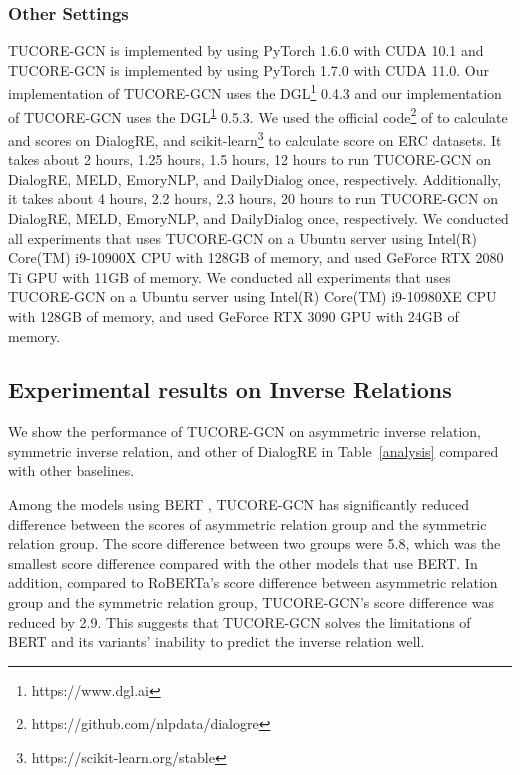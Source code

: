 \documentclass[11pt]{article}
\begin{document}
\subsubsection{Other Settings}
TUCORE-GCN is implemented by using PyTorch 1.6.0 with CUDA 10.1 and TUCORE-GCN is implemented by using PyTorch 1.7.0 with CUDA 11.0. Our implementation of TUCORE-GCN uses the DGL\footnote{\label{note}https://www.dgl.ai} 0.4.3 and our implementation of TUCORE-GCN uses the DGL\textsuperscript{\ref{note}} 0.5.3. We used the official code\footnote{https://github.com/nlpdata/dialogre} of \citep{yu-etal-2020-dialogue} to calculate  and  scores on DialogRE, and scikit-learn\footnote{https://scikit-learn.org/stable} to calculate  score on ERC datasets. It takes about 2 hours, 1.25 hours, 1.5 hours, 12 hours to run TUCORE-GCN on DialogRE, MELD, EmoryNLP, and DailyDialog once, respectively. Additionally, it takes about 4 hours, 2.2 hours, 2.3 hours, 20 hours to run TUCORE-GCN on DialogRE, MELD, EmoryNLP, and DailyDialog once, respectively. We conducted all experiments that uses TUCORE-GCN on a Ubuntu server using Intel(R) Core(TM) i9-10900X CPU with 128GB of memory, and used GeForce RTX 2080 Ti GPU with 11GB of memory. We conducted all experiments that uses TUCORE-GCN on a Ubuntu server using Intel(R) Core(TM) i9-10980XE CPU with 128GB of memory, and used GeForce RTX 3090 GPU with 24GB of memory.

\subsection{Experimental results on Inverse Relations}
We show the performance of TUCORE-GCN on asymmetric inverse relation, symmetric inverse relation, and other of DialogRE \citep{yu-etal-2020-dialogue} in Table~\ref{analysis} compared with other baselines. 

Among the models using BERT \citep{devlin-etal-2019-bert}, TUCORE-GCN has significantly reduced difference between the  scores of asymmetric relation group and the symmetric relation group. The  score difference between two groups were 5.8, which was the smallest  score difference compared with the other models that use BERT. In addition, compared to RoBERTa's  score difference between asymmetric relation group and the symmetric relation group, TUCORE-GCN's  score difference was reduced by 2.9. This suggests that TUCORE-GCN solves the limitations of BERT and its variants' inability to predict the inverse relation well.
\end{document}
